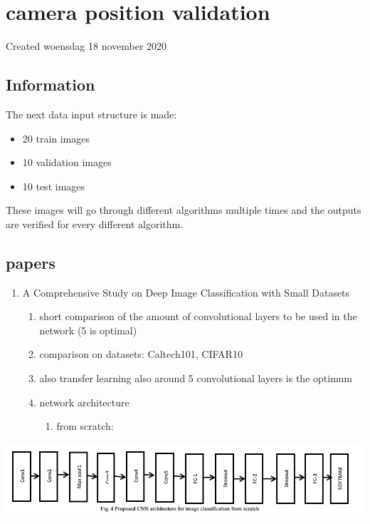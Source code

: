 \documentclass{article}
\begin{document}
		\section{camera position validation}

Created woensdag 18 november 2020



\subsection{Information}

The next data input structure is made:

	\begin{itemize}
	\item 20 train images
	\item 10 validation images
	\item 10 test images
	\end{itemize}


These images will go through different algorithms multiple times and the outputs are verified for every different algorithm.



\subsection{papers}



\begin{enumerate}[1]
\item A Comprehensive Study on Deep Image Classification with Small Datasets
	\begin{enumerate}[a]
	\item short comparison of the amount of convolutional layers to be used in the network (5 is optimal)
	\item comparison on datasets: Caltech101, CIFAR10
	\item also transfer learning also around 5 convolutional layers is the optimum
	\item network architecture
		\begin{enumerate}[1]
		\item from scratch:
		\end{enumerate}
	\end{enumerate}
\end{enumerate}
			\includegraphics[]{./ZimFiles_files/Research/Vision_Algorithm/camera_position_validation/paper1_arch_fromscratch.png}
			
\end{document}
